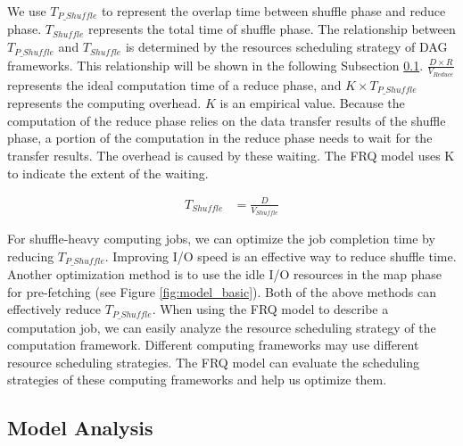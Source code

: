 {We use \(T_{P\_Shuffle}\) to represent the overlap time between shuffle phase and reduce phase. \(T_{Shuffle}\) represents the total time of shuffle phase. 
The relationship between \(T_{P\_Shuffle}\) and \(T_{Shuffle}\) is determined by the resources scheduling strategy of DAG frameworks. This relationship will be shown in the following Subsection \ref{model_analysis}.  
\(\frac{D \times R}{V_{Reduce}}\) represents the ideal computation time of a reduce phase, and \(K \times T_{P\_Shuffle}\) represents the computing overhead. \(K\) is an empirical value. 
Because the computation of the reduce phase relies on the data transfer results of the shuffle phase, a portion of the computation in the reduce phase needs to wait for the transfer results. The overhead is caused by these waiting. The FRQ model uses K to indicate the extent of the waiting.

\begin{equation}
\label{equation_Tshuffle}
\begin{aligned}
    T_{Shuffle} &= {{\frac{D}{V_{Shuffle}}}}
\end{aligned}
\end{equation}

For shuffle-heavy computing jobs, we can optimize the job completion time by reducing \(T_{P\_Shuffle}\). Improving I/O speed is an effective way to reduce shuffle time. Another optimization method is to use the idle I/O resources in the map phase for pre-fetching (see Figure \ref{fig:model_basic}). Both of the above methods can effectively reduce \(T_{P\_Shuffle}\). When using the FRQ model to describe a computation job, we can easily analyze the resource scheduling strategy of the computation framework. Different computing frameworks may use different resource scheduling strategies. The FRQ model can evaluate the scheduling strategies of these computing frameworks and help us optimize them.

\subsection{Model Analysis}\label{model_analysis}

}
